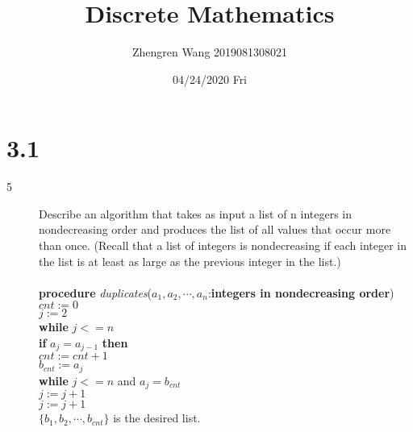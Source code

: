 \documentclass[UTF8]{article}
\title{Discrete Mathematics}
\author{Zhengren Wang 2019081308021}
\date{04/24/2020 Fri }
\begin{document}
\maketitle 

\part{3.1}
\begin{description}
    \item[5]Describe an algorithm that takes as input a list of n integers in nondecreasing order and produces the list of all values that occur more than once. (Recall that a list of integers is nondecreasing if each integer in the list is at least as large as the previous integer in the list.) \\\\
        \hspace*{0cm}       \textbf{procedure} \emph{duplicates}($a_1,a_2,\cdots,a_n$:\textbf{integers in nondecreasing order})  \\
        \hspace*{0cm}        $cnt:=0$                                                 \\
        \hspace*{0cm}        $j:=2$                                                 \\
        \hspace*{0cm}        \textbf{while} $j<=n$                                  \\
        \hspace*{1cm}            \textbf{if} $a_j=a_{j-1}$  \textbf{then}               \\
        \hspace*{2cm}                $cnt:=cnt+1$                                           \\
        \hspace*{2cm}                $b_{cnt}:=a_j$                                         \\
        \hspace*{2cm}                \textbf{while} $j<=n$ and $a_j =b_{cnt}$               \\
        \hspace*{3cm}                    $j:=j+1$                                       \\
        \hspace*{1cm}            $j:=j+1$                                           \\
        \hspace*{0cm}        $\{b_1,b_2,\cdots,b_{cnt}\}$ is the desired list.          \\


\end{description}
\end{document}
